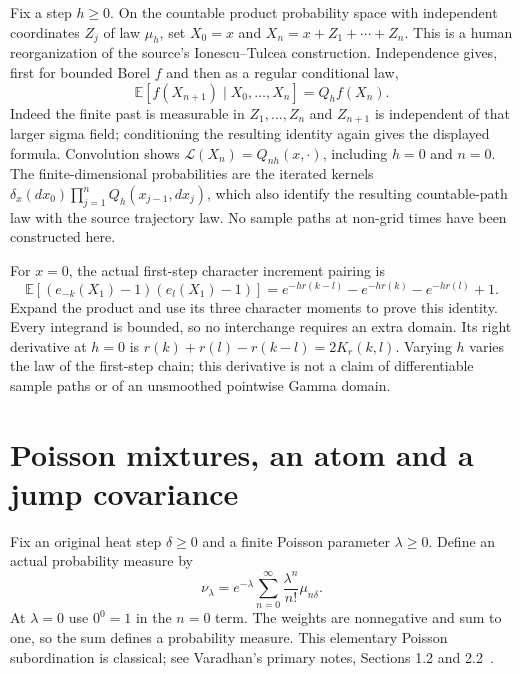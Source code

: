 \documentclass[11pt]{article}
\theoremstyle{remark}\newtheorem{remark}[theorem]{Remark}
\begin{document}
Fix a step $h\geq0$. On the countable product probability space with
independent coordinates $Z_j$ of law $\mu_h$, set
$X_0=x$ and $X_n=x+Z_1+\cdots+Z_n$. This is a human reorganization of
the source's Ionescu--Tulcea construction. Independence gives, first
for bounded Borel $f$ and then as a regular conditional law,
\[
 \mathbb E[f(X_{n+1})\mid X_0,\ldots,X_n]=Q_hf(X_n).
\]
Indeed the finite past is measurable in $Z_1,\ldots,Z_n$ and $Z_{n+1}$
is independent of that larger sigma field; conditioning the resulting
identity again gives the displayed formula. Convolution shows
$\mathcal L(X_n)=Q_{nh}(x,\cdot)$, including $h=0$ and $n=0$.
The finite-dimensional probabilities are the iterated kernels
$\delta_x(dx_0)\prod_{j=1}^nQ_h(x_{j-1},dx_j)$, which also identify
the resulting countable-path law with the source trajectory law.
No sample paths at non-grid times have been constructed here.

For $x=0$, the actual first-step character increment pairing is
\begin{equation}\label{eq:actual-pair}
 \mathbb E[(e_{-k}(X_1)-1)(e_l(X_1)-1)]
 =e^{-hr(k-l)}-e^{-hr(k)}-e^{-hr(l)}+1.
\end{equation}
Expand the product and use its three character moments to prove this
identity. Every integrand is bounded, so no interchange requires an
extra domain. Its right derivative at $h=0$ is
$r(k)+r(l)-r(k-l)=2K_r(k,l)$. Varying $h$ varies the law of the
first-step chain; this derivative is not a claim of differentiable
sample paths or of an unsmoothed pointwise Gamma domain.

\section{Poisson mixtures, an atom and a jump covariance}\label{sec:poisson-law}
Fix an original heat step $\delta\geq0$ and a finite Poisson parameter
$\lambda\geq0$. Define an actual probability measure by
\begin{equation}\label{eq:compound}
 \nu_\lambda=e^{-\lambda}\sum_{n=0}^\infty
        \frac{\lambda^n}{n!}\mu_{n\delta}.
\end{equation}
At $\lambda=0$ use $0^0=1$ in the $n=0$ term. The weights are
nonnegative and sum to one, so the sum defines a probability measure.
This elementary Poisson subordination is classical; see Varadhan's
primary notes, Sections 1.2 and 2.2~\cite{varadhan}.
\end{document}
